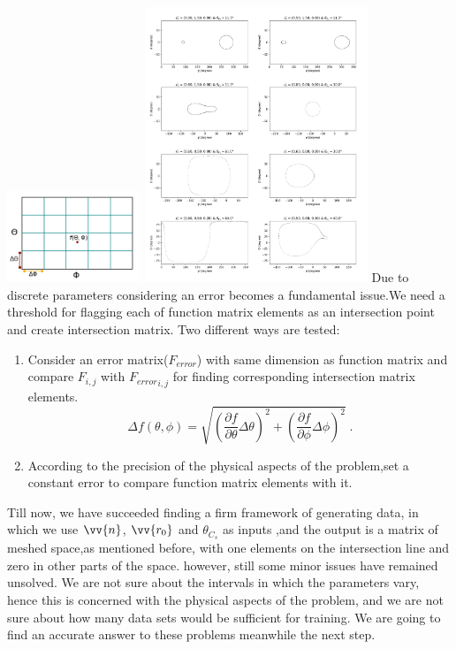 \documentclass{article}
\begin{document}
\begin{multicols}{2}
\hspace{+1.5cm}\includegraphics[width=0.3\textwidth]{download.png}
\label{fig:parameter space}
\medskip
\includegraphics[width=0.5\textwidth]{image.png}
\label{fig:sample}
\medskip
Due to discrete parameters considering an error becomes a fundamental issue.We need a threshold for flagging each of function matrix elements as an intersection point and create intersection matrix. Two different ways are tested:
\begin{enumerate}
\item
Consider an error matrix($F_{error}$) with same dimension as function matrix and compare $F_{i,j}$ with ${F_{error}}_{i,j}$ for finding corresponding intersection matrix elements.
\begin{equation}
   \Delta f(\theta , \phi) = \sqrt{ (\frac{\partial f}{\partial \theta} \Delta \theta)^2 + (\frac{\partial f}{\partial \phi} \Delta \phi)^2}\;.
   \label{Eq:equation1} %
\end{equation}
\item
According to the precision of the physical aspects of the problem,set a constant error to compare function matrix elements with it. 
\end{enumerate}

Till now, we have succeeded finding a firm framework of generating data, in which we use $\vv{n}$, $\vv{r_0}$ and $\theta_{C_s}$ as inputs ,and the output is a matrix of meshed space,as mentioned before, with one elements on the intersection line and zero in other parts of the space. however, still some minor issues have remained unsolved. We are not sure about the intervals in which the parameters vary, hence this is concerned with the physical aspects of the problem, and we are not sure about how many data sets would be sufficient for training. We are going to find an accurate answer to these problems meanwhile the next step.


\end{multicols}
\end{document}
